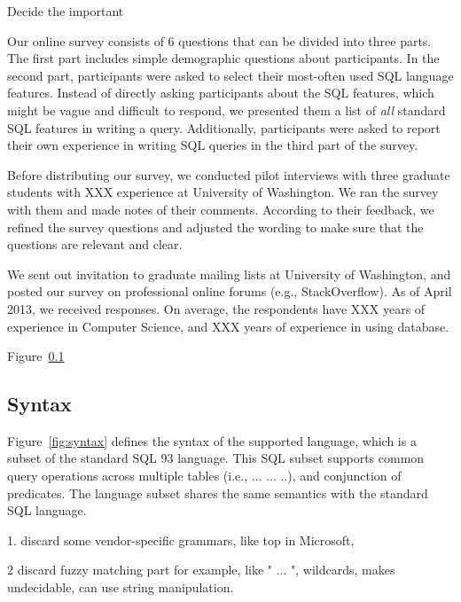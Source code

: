 
Decide the important

Our online survey consists of 6 questions that can be
divided into three parts. The first part includes
simple demographic questions about participants.
In the second part, participants were asked to select
their most-often  used SQL language features. 
Instead of directly asking participants about the SQL
features, which might be vague and difficult to respond,
we presented them a list of \textit{all} standard
SQL features in writing a query.
Additionally, participants were asked to report their 
own experience in writing SQL queries in the third part of the survey.

Before distributing our survey, we conducted pilot
interviews with three graduate students with XXX experience
at University of Washington. We ran the survey with them and
made notes of their comments. According to their feedback,
we refined the survey questions and adjusted the wording to
make sure that the questions are relevant and clear.


We sent out invitation to graduate mailing lists at
University of Washington, and posted our survey on
professional online forums (e.g., StackOverflow).
As of April 2013, we received \respnum responses.
On average, the respondents have XXX years of experience
in Computer Science, and XXX years of experience in
using database.

Figure~\ref{}

\subsection{Syntax}


Figure~\ref{fig:syntax} defines the syntax of the supported language,
which is a subset of the standard SQL 93 language. This SQL subset
supports common query operations across multiple tables (i.e.,
 ...  ... ..), and 
conjunction of predicates. The language
subset shares the same semantics with the standard SQL language.

1. discard some vendor-specific grammars, like top in Microsoft,

2 discard fuzzy matching part for example, like " ... ", wildcards,
makes undecidable, can use string manipulation.

